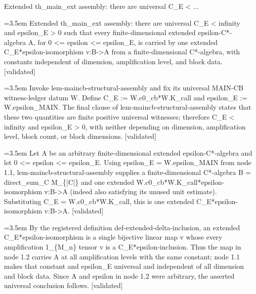 \documentclass{article}
\newcommand{\step}[1]{\par\noindent\hangindent=3.5em\hangafter=1%
  \makebox[3.5em][l]{\textbf{#1.}}}
\newcommand{\steptag}[1]{\hfill{\small\textsf{[#1]}}}
\begin{document}
\begin{proofbox}{Extended th\_main\_ext assembly: there are universal C\_E < ...}
\step{1} Extended th\_main\_ext assembly: there are universal C\_E < infinity and epsilon\_E > 0 such that every finite-dimensional extended epsilon-C*-algebra A, for 0 <= epsilon <= epsilon\_E, is carried by one extended C\_E*epsilon-isomorphism v:B->A from a finite-dimensional C*-algebra, with constants independent of dimension, amplification level, and block data. \steptag{validated} \\[6pt]
\step{1.1} Invoke lem-maincb-structural-assembly and fix its universal MAIN-CB witness-ledger datum W. Define C\_E := W.c0\_cb*W.K\_call and epsilon\_E := W.epsilon\_MAIN. The final clause of lem-maincb-structural-assembly states that these two quantities are finite positive universal witnesses; therefore C\_E < infinity and epsilon\_E > 0, with neither depending on dimension, amplification level, block count, or block dimensions. \steptag{validated} \\[4pt]
\step{1.2} Let A be an arbitrary finite-dimensional extended epsilon-C*-algebra and let 0 <= epsilon <= epsilon\_E. Using epsilon\_E = W.epsilon\_MAIN from node 1.1, lem-maincb-structural-assembly supplies a finite-dimensional C*-algebra B = direct\_sum\_C M\_\{|C|\} and one extended W.c0\_cb*W.K\_call*epsilon-isomorphism v:B->A (indeed also satisfying its unused unit estimate). Substituting C\_E = W.c0\_cb*W.K\_call, this is one extended C\_E*epsilon-isomorphism v:B->A. \steptag{validated} \\[4pt]
\step{1.3} By the registered definition def-extended-delta-inclusion, an extended C\_E*epsilon-isomorphism is a single bijective linear map v whose every amplification 1\_\{M\_n\} tensor v is a C\_E*epsilon-inclusion. Thus the map in node 1.2 carries A at all amplification levels with the same constant; node 1.1 makes that constant and epsilon\_E universal and independent of all dimension and block data. Since A and epsilon in node 1.2 were arbitrary, the asserted universal conclusion follows. \steptag{validated} \\[4pt]
\end{proofbox}
\end{document}
